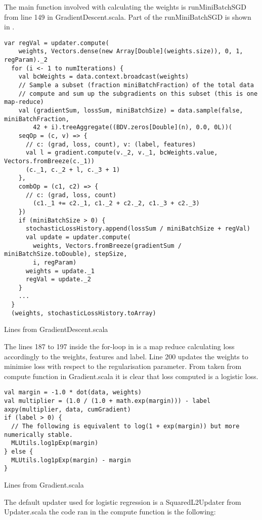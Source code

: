 The main function involved with calculating the weights is runMiniBatchSGD from line 149 in GradientDescent.scala. Part of the runMiniBatchSGD is shown in . 
\begin{listing}[H]
\begin{verbatim}
var regVal = updater.compute(
    weights, Vectors.dense(new Array[Double](weights.size)), 0, 1, regParam)._2
  for (i <- 1 to numIterations) {
    val bcWeights = data.context.broadcast(weights)
    // Sample a subset (fraction miniBatchFraction) of the total data
    // compute and sum up the subgradients on this subset (this is one map-reduce)
    val (gradientSum, lossSum, miniBatchSize) = data.sample(false, miniBatchFraction,
        42 + i).treeAggregate((BDV.zeros[Double](n), 0.0, 0L))(
    seqOp = (c, v) => {
      // c: (grad, loss, count), v: (label, features)
      val l = gradient.compute(v._2, v._1, bcWeights.value, Vectors.fromBreeze(c._1))
      (c._1, c._2 + l, c._3 + 1)
    },
    combOp = (c1, c2) => {
      // c: (grad, loss, count)
        (c1._1 += c2._1, c1._2 + c2._2, c1._3 + c2._3)
    })
    if (miniBatchSize > 0) {
      stochasticLossHistory.append(lossSum / miniBatchSize + regVal)
      val update = updater.compute(
        weights, Vectors.fromBreeze(gradientSum / miniBatchSize.toDouble), stepSize,
        i, regParam)
      weights = update._1
      regVal = update._2
    }
    ...
  }
  (weights, stochasticLossHistory.toArray)
\end{verbatim}
\caption{Lines from GradientDescent.scala}
\label{lst:runMiniBatchSGD}
\end{listing}
The lines 187 to 197 inside the for-loop in  is a map reduce calculating loss accordingly to the weights, features and label. Line 200 updates the weights to minimise loss with respect to the regularisation parameter.
From  taken from compute function in Gradient.scala it is clear that loss computed is a logistic loss.  
\begin{listing}[H]
\begin{verbatim}
val margin = -1.0 * dot(data, weights)
val multiplier = (1.0 / (1.0 + math.exp(margin))) - label
axpy(multiplier, data, cumGradient)
if (label > 0) {
  // The following is equivalent to log(1 + exp(margin)) but more numerically stable.
  MLUtils.log1pExp(margin)
} else {
  MLUtils.log1pExp(margin) - margin
}
\end{verbatim}
\caption{Lines from Gradient.scala}
\label{lst:sparkloss}
\end{listing}
The default updater used for logistic regression is a SquaredL2Updater from Updater.scala
the code ran in the compute function is the following:

